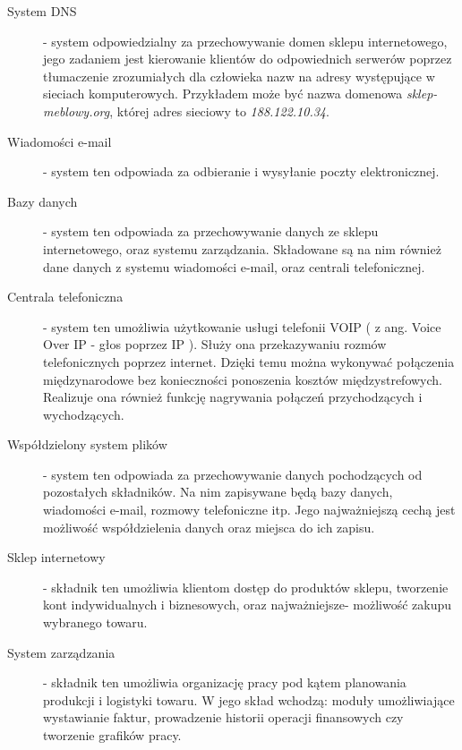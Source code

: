 				\begin{description}
						\item[System DNS] - system odpowiedzialny za przechowywanie domen sklepu internetowego, jego zadaniem jest kierowanie klientów do odpowiednich serwerów poprzez tłumaczenie zrozumiałych dla człowieka nazw na adresy występujące w sieciach komputerowych. Przykładem może być nazwa domenowa \textit{sklep-meblowy.org}, której adres sieciowy to \textit{188.122.10.34}.
						
						\item[Wiadomości e-mail] - system ten odpowiada za odbieranie i wysyłanie poczty elektronicznej.
						
						\item[Bazy danych] - system ten odpowiada za przechowywanie danych ze sklepu internetowego, oraz systemu zarządzania. Składowane są na nim również dane danych z systemu wiadomości e-mail, oraz centrali telefonicznej. 
				
						\item[Centrala telefoniczna] - system ten umożliwia użytkowanie usługi telefonii VOIP ( z ang. Voice Over IP - głos poprzez IP ). Służy ona przekazywaniu rozmów telefonicznych poprzez internet. Dzięki temu można wykonywać połączenia międzynarodowe bez konieczności ponoszenia kosztów międzystrefowych. Realizuje ona również funkcję nagrywania połączeń przychodzących i wychodzących.  
				
						\item[Współdzielony system plików] - system ten odpowiada za przechowywanie danych pochodzących od pozostałych składników. Na nim zapisywane będą bazy danych, wiadomości e-mail, rozmowy telefoniczne itp. Jego najważniejszą cechą jest możliwość współdzielenia danych oraz miejsca do ich zapisu.
				
						\item[Sklep internetowy] - składnik ten umożliwia klientom dostęp do produktów sklepu, tworzenie kont indywidualnych i biznesowych, oraz najważniejsze- możliwość zakupu wybranego towaru.
					
						\item[System zarządzania] - składnik ten umożliwia organizację pracy pod kątem planowania produkcji i logistyki towaru. W jego skład wchodzą: moduły umożliwiające wystawianie faktur, prowadzenie historii operacji finansowych czy tworzenie grafików pracy. 
					\end{description}
 
